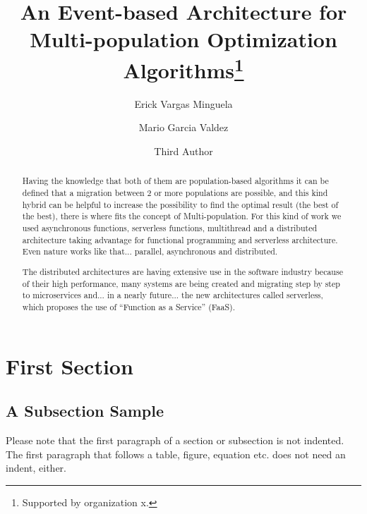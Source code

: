 \documentclass[runningheads]{llncs}
\begin{document}
%
\title{An Event-based Architecture for Multi-population Optimization Algorithms\thanks{Supported by organization x.}}
%
%
\author{Erick Vargas Minguela \and
Mario Garcia Valdez \and
Third Author}
%
%
%
\maketitle              %
%
\begin{abstract}
    Having the knowledge that both of them are population-based algorithms it can be
    defined that a migration between 2 or more populations are possible, and this kind
    hybrid can be helpful to increase the possibility to find the optimal result (the best
    of the best), there is where fits the concept of Multi-population.
    For this kind of work we used asynchronous functions, serverless functions,
multithread and a distributed architecture taking advantage for functional
programming and serverless architecture.
Even nature works like that... parallel, asynchronous and distributed.

The distributed architectures are having extensive use in the software
industry because of their high performance, many systems are being
created and migrating step by step to microservices and... in a nearly
future... the new architectures called serverless, which proposes the
use of “Function as a Service” (FaaS).

\end{abstract}
%
%
%
\section{First Section}
\subsection{A Subsection Sample}
Please note that the first paragraph of a section or subsection is
not indented. The first paragraph that follows a table, figure,
equation etc. does not need an indent, either.
\end{document}
